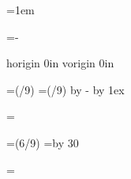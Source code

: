 \parindent=1em

\lineskiplimit=-\maxdimen
{}

\emergencystretch=0pt
\hfuzz=0pt

\def\firstnoindent{\global\everypar={\wipeeverypar\setbox7=\lastbox}}
\def\wipeeverypar{\global\everypar={}}

{}


\pagewidth=150mm	
\pageheight=225mm

\pdfvariable horigin 0in	
\pdfvariable vorigin 0in

\hoffset=\dimexpr(\pagewidth/9)\relax	
\voffset=\dimexpr(\pageheight/9)\relax
\advance\voffset by -\topskip
\advance\voffset by 1ex


\topskip=\baselineskip %

\hsize=\dimexpr(6\pagewidth/9)
\vsize=\topskip \advance\vsize by 30\baselineskip

\newdimen\originalvsize \originalvsize=\vsize

\def\adjustpage#1#2{%
	\expandafter\xdef\csname ap:#1\endcsname{#2}
	\ifnum #1=1
		\setvsize
	\fi
}

\def\setvsize{%
	\global\vsize=\originalvsize
	\ifcsname ap:\the\pageno\endcsname
		\global\advance \vsize by \csname ap:\the\pageno\endcsname \baselineskip
	\fi
}




\def\makeheadline{%
    \vbox to0pt{%
        \vss
        \hbox to\hsize{%
            \the\headline
        }%
        \vskip-\topskip
        \vskip0.5\baselineskip %
        \hbox{}%
    }%
    \nointerlineskip
}


